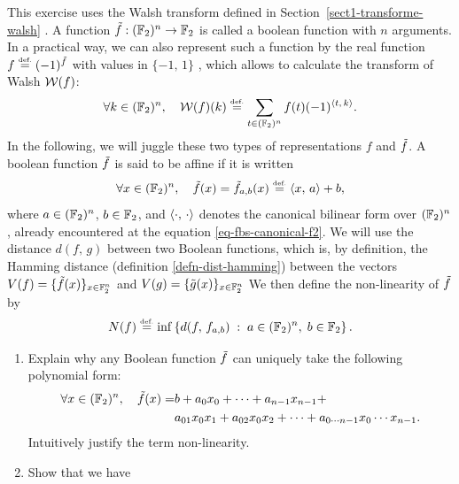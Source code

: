  
\begin{exo}
\label{exo-boolean-functions}
 
    This exercise uses the Walsh transform defined in Section~\ref{sect1-transforme-walsh} . A function $ \tilde{f}: (\mathbb{F}_2)^n \rightarrow \mathbb{F}_2 $ is called a boolean function with $ n $ arguments. In a practical way, we can also represent such a function by the real function $ f \stackrel{\mbox{\upshape\tiny def.}}{=}(-1)^{\tilde{f}} $ with values in $ \{- 1, \, 1\} $ , which allows to calculate the transform of Walsh $ \mathcal{W} (f) $:
\begin{equation*}
\forall k \in (\mathbb{F}_2)^n, \quad \mathcal{W} (f) (k) \stackrel{\mbox{\upshape\tiny def.}}{=} \sum_{t \in (\mathbb{F}_2)^n}{f(t) (-1)^{\langle t,\,k\rangle}}.
\end{equation*}
In the following, we will juggle these two types of representations $ f $ and $ \tilde{f} $. A boolean function $ \tilde{f} $ is said to be affine if it is written
\begin{equation*}
\forall x \in (\mathbb{F}_2)^n, \quad \tilde{f} (x) = \tilde{f}_{a, b} (x) \stackrel{\mbox{\upshape\tiny def.}}{=} \langle x,\,a\rangle + b,
\end{equation*}
where $ a \in (\mathbb{F}_2)^n $, $ b \in \mathbb{F}_2 $, and $ \langle \cdot,\,\cdot\rangle $ denotes the canonical bilinear form over $ (\mathbb{F}_2)^n $, already encountered at the equation \eqref{eq-fbs-canonical-f2}. We will use the distance $ d (f, \, g) $ between two Boolean functions, which is, by definition, the Hamming distance (definition \ref{defn-dist-hamming}) between the vectors $ V (f) = \{\tilde{f} (x)\}_{x \in \mathbb{F}_2^n} $ and $ V (g) = \{\tilde{g} (x)\}_{x \in \mathbb{F}_2^n} $ We then define the non-linearity of $ \tilde{f} $ by
\begin{equation*}
N (f) \stackrel{\mbox{\upshape\tiny def.}}{=} \inf \left\{ d (f, \, f_{a, b}) \;:\; a \in (\mathbb{F}_2)^n, \; b \in \mathbb{F}_2 \right\}.
\end{equation*}
\begin{enumerate}
\item Explain why any Boolean function $ \tilde{f} $ can uniquely take the following polynomial form:
\begin{align*}
\forall x \in (\mathbb{F}_2)^n, \quad \tilde{f} (x) = & b + a_0 x_0 + \cdots + a_{n-1} x_{n-1} + \\
& a_{01} x_0 x_1 + a_{02} x_0 x_2 + \cdots + a_{0 \cdots n-1} x_0 \cdots x_{n-1}.
\end{align*}
Intuitively justify the term non-linearity.
\item {} Show that we have
\begin{equation*}

\end{equation*}
\end{enumerate}
\end{exo}
